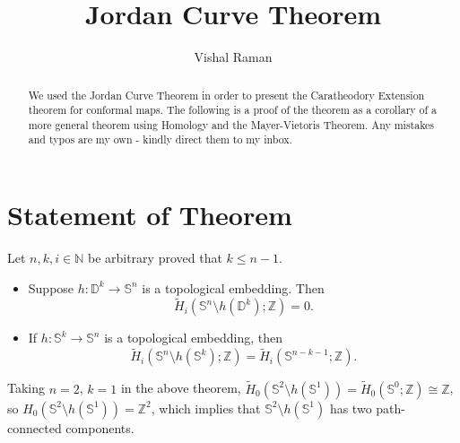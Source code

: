 \documentclass[11pt]{scrartcl}
\newcommand{\N}{\mathbb{N}}
\newcommand{\Z}{\mathbb{Z}}
\renewcommand{\tilde}{\widetilde}
\begin{document}
\title{Jordan Curve Theorem}
\author{Vishal Raman}
\maketitle
\begin{abstract}
We used the Jordan Curve Theorem in order to present the Caratheodory Extension theorem for conformal maps.  The following is a proof of the theorem as a corollary of a more general theorem using Homology and the Mayer-Vietoris Theorem.  Any mistakes and typos are my own - kindly direct them to my inbox.
\end{abstract}
\tableofcontents
\section{Statement of Theorem}
\begin{theorem}
Let $n, k, i \in \N$ be arbitrary proved that $k \le n-1$.  
\begin{itemize}
\item Suppose $h: \mathbb D^k \to \mathbb S^n$ is a topological embedding.  Then $$\tilde{H}_i(\mathbb S^n \setminus h(\mathbb D^k); \Z) = 0.$$
\item If $h: \mathbb S^k \to \mathbb S^n$ is a topological embedding, then $$\tilde{H}_i(\mathbb S^n\setminus h(\mathbb S^k); \Z) = \tilde{H}_i(\mathbb S^{n-k-1}; \Z).$$
\end{itemize}
\end{theorem}
\begin{corollary} Taking $n = 2$, $k = 1$ in the above theorem, $\tilde{H}_0(\mathbb S^2 \setminus h(\mathbb S^1)) = \tilde{H}_0(\mathbb S^0; \Z) \cong \Z$, so $H_0(\mathbb S^{2} \setminus h(\mathbb S^1)) = \Z^2$, which implies that $\mathbb S^2 \setminus h(\mathbb S^1)$ has two path-connected components.  
\end{corollary}
\pagebreak
\end{document}
